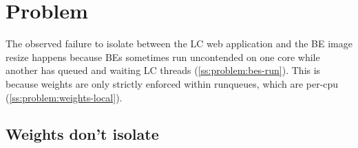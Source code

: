 \section{Problem}\label{s:problem}

The observed failure to isolate between the LC web application and the BE image
resize happens because BEs sometimes run uncontended on one core while another
has queued and waiting LC threads (\autoref{ss:problem:bes-run}). This is
because weights are only strictly enforced within runqueues, which are per-cpu
(\autoref{ss:problem:weights-local}).


\subsection{Weights don't isolate}\label{ss:problem:bes-run}

